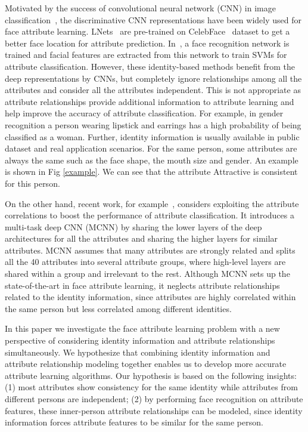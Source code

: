 \documentclass[wcp]{jmlr}
\begin{document}
	Motivated by the success of convolutional neural network (CNN) in image classification~\cite{AlexNet,GoogleNet,fasterrcnn,fastrcnn}, the discriminative CNN representations have been widely used for face attribute learning. LNets~\cite{CelebA} are pre-trained on CelebFace~\cite{CelebFace} dataset to get a better face location for attribute prediction. In~\cite{ClassificationCNN}, a face recognition network is trained and facial features are extracted from this network to train SVMs for attribute classification. However, these identity-based methods benefit from the deep representations by CNNs, but completely ignore relationships among all the attributes and consider all the attributes independent. This is not appropriate as attribute relationships provide additional information to attribute learning and help improve the accuracy of attribute classification. For example, in gender recognition a person wearing lipstick and earrings has a high probability of being classified as a woman. Further, identity information is usually available in public dataset and real application scenarios. For the same person, some attributes are always the same such as the face shape, the mouth size and gender. An example is shown in Fig \ref{example}. We can see that the attribute Attractive is consistent for this person. 
	
	On the other hand, recent work, for example~\cite{MCNN}, considers exploiting the attribute correlations to boost the performance of attribute classification. It introduces a multi-task deep CNN (MCNN) by sharing the lower layers of the deep architectures for all the attributes and sharing the higher layers for similar attributes. MCNN assumes that many attributes are strongly related and splits all the 40 attributes into several attribute groups, where high-level layers are shared within a group and irrelevant to the rest. Although MCNN sets up the state-of-the-art in face attribute learning, it neglects attribute relationships related to the identity information, since attributes are highly correlated within the same person but less correlated among different identities.
	
	In this paper we investigate the face attribute learning problem with a new perspective of considering identity information and attribute relationships simultaneously. We hypothesize that combining identity information and attribute relationship modeling together enables us to develop more accurate attribute learning algorithms. Our hypothesis is based on the following insights: (1) most attributes show consistency for the same identity while attributes from different persons are independent; (2) by performing face recognition on attribute features, these inner-person attribute relationships can be modeled, since identity information forces attribute features to be similar for the same person.
	
\end{document}

